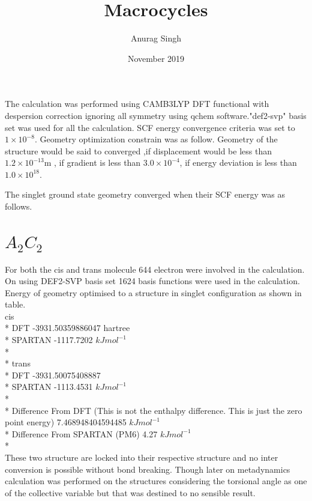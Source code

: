 \documentclass{article}
\title{Macrocycles}
\author{Anurag Singh }
\date{November 2019}
\begin{document}
The calculation was performed using CAMB3LYP DFT functional with despersion correction ignoring all symmetry using qchem software."def2-svp" basis set was used for all the calculation. SCF energy convergence criteria was set to \(1 \times 10^{-8}\).
Geometry optimization constrain was as follow. Geometry of the structure would be said to converged ,if displacement would be less than \(1.2 \times 10^{-13}\)m , if gradient is less than \(3.0 \times 10^{-4} \), if energy deviation is less than \(1.0 \times 10^{18} \). 

The singlet ground state geometry converged when their SCF energy was as follows. 

\section{\(A_{2}C_{2}\)}
    For both the cis and trans molecule 644 electron were involved in the calculation. On using DEF2-SVP basis set 1624 basis functions were used in the calculation. Energy of geometry optimised to a structure in singlet configuration as shown in table.\\
    cis\\*  
    DFT    -3931.50359886047 hartree\\*
    SPARTAN -1117.7202 \(kJmol^{-1}\)\\*\\*
    trans\\*
    DFT     -3931.50075408887\\*
    SPARTAN -1113.4531  \(kJmol^{-1}\)\\*\\*
    Difference From DFT (This is not the enthalpy difference. This is just the zero point energy) 7.468948404594485 \(kJmol^{-1}\)\\*
    Difference From SPARTAN (PM6) 4.27 \(kJmol^{-1}\)\\*\\
    These two structure are locked into their respective structure and no inter conversion is possible without bond breaking.
    Though later on metadynamics calculation was performed on the structures considering the torsional angle as one of the collective variable but that was destined to no sensible result. 
\end{document}

